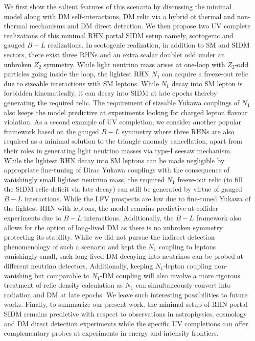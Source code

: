 \documentclass[prd,nofootinbib,preprint,superscriptaddress]{revtex4}
\begin{document}
We first show the salient features of this scenario by discussing the minimal model along with DM self-interactions, DM relic via a hybrid of thermal and non-thermal mechanisms and DM direct detection. We then propose two UV complete realizations of this minimal RHN portal SIDM setup namely, scotogenic and gauged $B-L$ realizations. In scotogenic realization, in addition to SM and SIDM sectors, there exist three RHNs and an extra scalar doublet odd under an unbroken $Z_2$ symmetry. While light neutrino mass arises at one-loop with $Z_2$-odd particles going inside the loop, the lightest RHN $N_1$ can acquire a freeze-out relic due to sizeable interactions with SM leptons. While $N_1$ decay into SM lepton is forbidden kinematically, it can decay into SIDM at late epochs thereby generating the required relic. The requirement of sizeable Yukawa couplings of $N_1$ also keeps the model predictive at experiments looking for charged lepton flavour violation. As a second example of UV completion, we consider another popular framework based on the gauged $B-L$ symmetry where three RHNs are also required as a minimal solution to the triangle anomaly cancellation, apart from their roles in generating light neutrino masses via type-I seesaw mechanism. While the lightest RHN decay into SM leptons can be made negligible by appropriate fine-tuning of Dirac Yukawa couplings with the consequence of vanishingly small lightest neutrino mass, the required $N_1$ freeze-out relic (to fill the SIDM relic deficit via late decay) can still be generated by virtue of gauged $B-L$ interactions. While the LFV prospects are low due to fine-tuned Yukawa of the lightest RHN with leptons, the model remains predictive at collider experiments due to $B-L$ interactions. Additionally, the $B-L$ framework also allows for the option of long-lived DM as there is no unbroken symmetry protecting its stability. While we did not pursue the indirect detection phenomenology of such a scenario and kept the $N_1$ coupling to leptons vanishingly small, such long-lived DM decaying into neutrinos can be probed at different neutrino detectors. Additionally, keeping $N_1$-lepton coupling non-vanishing but comparable to $N_1$-DM coupling will also involve a more rigorous treatment of relic density calculation as $N_1$ can simultaneously convert into radiation and DM at late epochs. We leave such interesting possibilities to future works. Finally, to summarize our present work, the minimal setup of RHN portal SIDM remains predictive with respect to observations in astrophysics, cosmology and DM direct detection experiments while the specific UV completions can offer complementary probes at experiments in energy and intensity frontiers.
\end{document}
